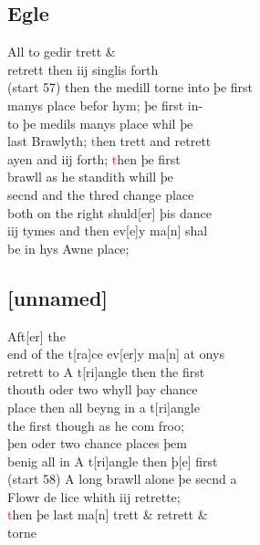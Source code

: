 \documentclass[12pt,letter]{article} %
\newcommand{\red}[1]{\textcolor{red}{#1}}
\newcommand{\srcpg}[1]{(start #1)}
\begin{document}
\subsection{Egle}
All to gedir trett \& \\ 
retrett then iij singlis forth \\
\srcpg{57} then the medill torne into þe first \\ 
manys place befor hym; þe first in-\\
to þe medils manys place whil þe \\
last Brawlyth; \red{t}hen trett and retrett \\
ayen and iij forth; \red{t}hen þe first \\
brawll as he standith whill þe \\
secnd and the thred change place \\
both on the right shuld{[}er{]} þis dance \\
iij tymes and then ev{[}e{]}y ma{[}n{]} shal \\
be in hys Awne place;

\subsection{{[}unnamed{]}}
Aft{[}er{]} the \\
end of the t{[}ra{]}ce ev{[}er{]}y ma{[}n{]} at onys \\
retrett to A t{[}ri{]}angle then the first \\
thouth oder two whyll þay chance \\
place then all beyng in a t{[}ri{]}angle \\
the first though as he com froo; \\
þen oder two chance places þem \\
benig all in A t{[}ri{]}angle then þ{[}e{]} first \\
\srcpg{58} A long brawll alone þe secnd a \\
Flowr de lice whith iij retrette; \\
\red{t}hen þe last ma{[}n{]} trett \& retrett \& \\
torne
\end{document}
